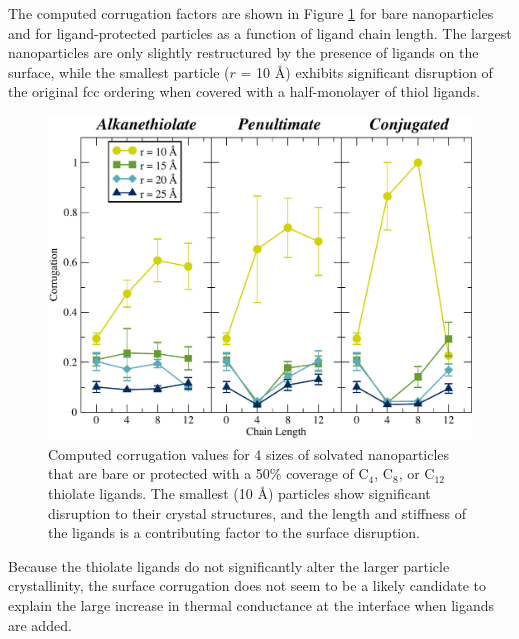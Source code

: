 \documentclass[aps,jcp,preprint,showpacs,superscriptaddress,groupedaddress]{revtex4-1}  %
\begin{document}
The computed corrugation factors are shown in Figure
\ref{fig:NPthiols_corrugation} for bare nanoparticles and for
ligand-protected particles as a function of ligand chain length. The
largest nanoparticles are only slightly restructured by the presence
of ligands on the surface, while the smallest particle ($r$ = 10 \AA)
exhibits significant disruption of the original fcc ordering when
covered with a half-monolayer of thiol ligands.

\begin{figure}
  \includegraphics[width=\linewidth]{figures/C3.pdf}
  \caption{Computed corrugation values for 4 sizes of solvated
    nanoparticles that are bare or protected with a 50\% coverage of
    C$_{4}$, C$_{8}$, or C$_{12}$ thiolate ligands.  The smallest (10
    \AA ) particles show significant disruption to their crystal
    structures, and the length and stiffness of the ligands is a
    contributing factor to the surface disruption.}
  \label{fig:NPthiols_corrugation}
\end{figure}

Because the thiolate ligands do not significantly alter the larger
particle crystallinity, the surface corrugation does not seem to be a
likely candidate to explain the large increase in thermal conductance
at the interface when ligands are added.

% 
\end{document}
